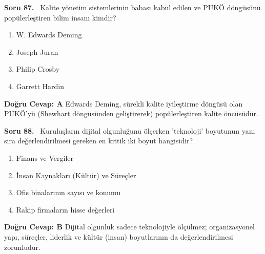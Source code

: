\documentclass[11pt,a4paper,openany]{book}
\begin{document}
\needspace{5cm}
\vspace{8pt}
\noindent\textbf{\large\sffamily Soru 87.} \ Kalite yönetim sistemlerinin babası kabul edilen ve PUKÖ döngüsünü popülerleştiren bilim insanı kimdir?
\begin{enumerate}[label=\Alph*), leftmargin=25pt, topsep=4pt, itemsep=2pt]
    \item W. Edwards Deming
    \item Joseph Juran
    \item Philip Crosby
    \item Garrett Hardin
\end{enumerate}
\vspace{4pt}
\begin{tcolorbox}[title=Cevap ve Açıklama, colback=gray!3!white, colframe=primarycolor!90!black, arc=2mm, fonttitle=\bfseries\sffamily, top=6pt, bottom=6pt]
    \textbf{Doğru Cevap: A}
    \vspace{2pt}
    Edwards Deming, sürekli kalite iyileştirme döngüsü olan PUKÖ'yü (Shewhart döngüsünden geliştirerek) popülerleştiren kalite öncüsüdür.
\end{tcolorbox}
\vspace{10pt}

\needspace{5cm}
\vspace{8pt}
\noindent\textbf{\large\sffamily Soru 88.} \ Kuruluşların dijital olgunluğunu ölçerken 'teknoloji' boyutunun yanı sıra değerlendirilmesi gereken en kritik iki boyut hangisidir?
\begin{enumerate}[label=\Alph*), leftmargin=25pt, topsep=4pt, itemsep=2pt]
    \item Finans ve Vergiler
    \item İnsan Kaynakları (Kültür) ve Süreçler
    \item Ofis binalarının sayısı ve konumu
    \item Rakip firmaların hisse değerleri
\end{enumerate}
\vspace{4pt}
\begin{tcolorbox}[title=Cevap ve Açıklama, colback=gray!3!white, colframe=primarycolor!90!black, arc=2mm, fonttitle=\bfseries\sffamily, top=6pt, bottom=6pt]
    \textbf{Doğru Cevap: B}
    \vspace{2pt}
    Dijital olgunluk sadece teknolojiyle ölçülmez; organizasyonel yapı, süreçler, liderlik ve kültür (insan) boyutlarının da değerlendirilmesi zorunludur.
\end{tcolorbox}
\vspace{10pt}
\end{document}
